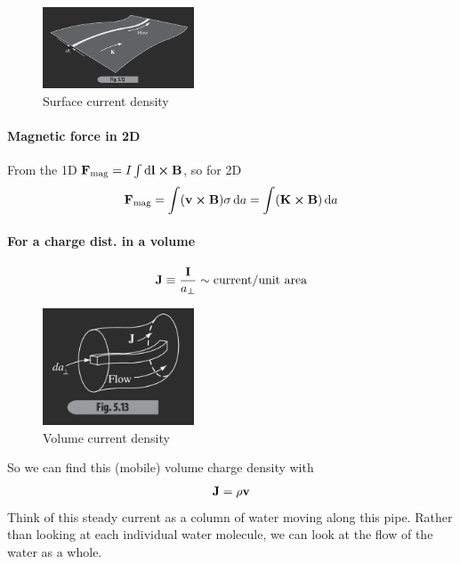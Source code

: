 \documentclass[../main.tex]{subfiles}
\begin{document}
\begin{figure}[ht]
    \centering
    \includegraphics[width=0.4\textwidth]{fig5_12.png}
    \caption{Surface current density}
    \label{fig:fig5_12}
\end{figure}

\paragraph{Magnetic force in 2D} From the 1D $\vb F_\text{mag} = I \int \dd{\vb l} \cross \vb B$, so for 2D
\begin{align*}
    \vb F_\text{mag} = \int (\vb v \cross \vb B) \sigma \dd{a} = \int (\vb K \cross \vb B) \dd{a}
\end{align*}

\paragraph{For a charge dist. in a volume}
\begin{align*}
    \vb J \equiv \frac{\vb I}{a_\perp} \sim \text{current/unit area}
\end{align*}

\begin{figure}[ht]
    \centering
    \includegraphics[width=0.4\textwidth]{fig5_13.png}
    \caption{Volume current density}
    \label{fig:fig5_13}
\end{figure}

So we can find this (mobile) volume charge density with
\begin{align*}
    \vb J = \rho \vb v
\end{align*}
Think of this steady current as a column of water moving along this pipe.
Rather than looking at each individual water molecule, we can look at the flow of the water as a whole.
\end{document}
